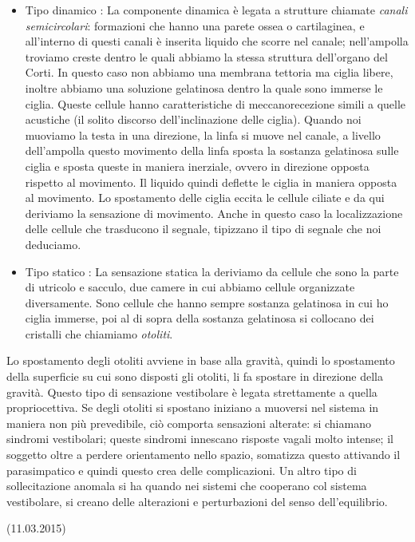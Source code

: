\documentclass[a4paper,12pt]{article}
\begin{document}
\begin{itemize}
\item{Tipo dinamico : La componente dinamica è legata a strutture chiamate \emph{canali semicircolari}: formazioni che hanno una parete ossea o cartilaginea, e all'interno di questi canali è inserita liquido che scorre nel canale; nell'ampolla troviamo creste dentro le quali abbiamo la stessa struttura dell'organo del Corti. In questo caso non abbiamo una membrana tettoria ma ciglia libere, inoltre abbiamo una soluzione gelatinosa dentro la quale sono immerse le ciglia. Queste cellule hanno caratteristiche di meccanorecezione simili a quelle acustiche (il solito discorso dell'inclinazione delle ciglia). Quando noi muoviamo la testa in una direzione, la linfa si muove nel canale, a livello dell'ampolla questo movimento della linfa sposta la sostanza gelatinosa sulle ciglia e sposta queste in maniera inerziale, ovvero in direzione opposta rispetto al movimento. Il liquido quindi deflette le ciglia in maniera opposta al movimento. Lo spostamento delle ciglia eccita le cellule ciliate e da qui deriviamo la sensazione di movimento. Anche in questo caso la localizzazione delle cellule che trasducono il segnale, tipizzano il tipo di segnale che noi deduciamo.}
\item{Tipo statico : La sensazione statica la deriviamo da cellule che sono la parte di utricolo e sacculo, due camere in cui abbiamo cellule organizzate diversamente. Sono cellule che hanno sempre sostanza gelatinosa in cui ho ciglia immerse, poi al di sopra della sostanza gelatinosa si collocano dei cristalli che chiamiamo \emph{otoliti}.}
\end{itemize}

Lo spostamento degli otoliti avviene in base alla gravità, quindi lo spostamento della superficie su cui sono disposti gli otoliti, li fa spostare in direzione della gravità. Questo tipo di sensazione vestibolare è legata strettamente a quella propriocettiva. Se degli otoliti si spostano iniziano a muoversi nel sistema in maniera non più prevedibile, ciò comporta sensazioni alterate: si chiamano sindromi vestibolari; queste sindromi innescano risposte vagali molto intense; il soggetto oltre a perdere orientamento nello spazio, somatizza questo attivando il parasimpatico e quindi questo crea delle complicazioni. Un altro tipo di sollecitazione anomala si ha quando nei sistemi che cooperano col sistema vestibolare, si creano delle alterazioni e perturbazioni del senso dell'equilibrio. 	

(11.03.2015)
\end{document}
